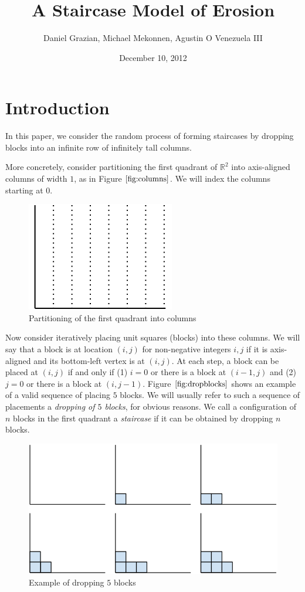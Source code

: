 \documentclass[12pt]{amsart}
\title{A Staircase Model of Erosion}
\author{Daniel Grazian, Michael Mekonnen, Agustin O Venezuela III}
\date{December 10, 2012}
\newcommand{\R}{\mathbb{R}}
\newcommand{\newfigure}[3]{
\begin{figure}
#3
\caption{#2 \label{#1}}
\end{figure}
}
\newcommand{\newsection}[2]{
\section{#1 \label{#2}}
}
\begin{document}
\maketitle

\newsection{Introduction}{sec:intro}
In this paper, we consider the random process of forming staircases by dropping blocks into an infinite row of infinitely tall columns.

More concretely, consider partitioning the first quadrant of $\R^2$ into axis-aligned columns of width $1$, as in Figure $\ref{fig:columns}$. We will index the columns starting at $0$.

\newfigure{fig:columns}{Partitioning of the first quadrant into columns}{
\includegraphics[scale=0.4]{columns_fig.png}
}

Now consider iteratively placing unit squares (blocks) into these columns. We will say that a block is at location $(i, j)$ for non-negative integers $i, j$ if it is axis-aligned and its bottom-left vertex is at $(i, j)$. At each step, a block can be placed at $(i, j)$ if and only if (1) $i = 0$ or there is a block at $(i - 1, j)$ and (2) $j = 0$ or there is a block at $(i, j - 1)$. Figure $\ref{fig:dropblocks}$ shows an example of a valid sequence of placing $5$ blocks. We will usually refer to such a sequence of placements a \textit{dropping of $5$ blocks}, for obvious reasons. We call a configuration of $n$ blocks in the first quadrant a \textit{staircase} if it can be obtained by dropping $n$ blocks.

\newfigure{fig:dropblocks}{Example of dropping $5$ blocks}{
\includegraphics[scale=0.4]{dropblocks_fig.png}
}
\end{document}

